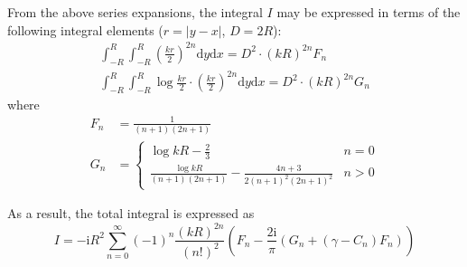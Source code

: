 \documentclass[a4paper,11pt]{article}
\newcommand{\td}{\mathrm{d}}
\newcommand{\ti}{\mathrm{i}}
\begin{document}
From the above series expansions, the integral $I$ may be expressed in terms of the following integral elements ($r=|y-x|$, $D = 2R$):
%
\begin{align}
\int_{-R}^{R} \int_{-R}^R  \left(\frac{kr}{2}\right)^{2n}  \td y \td x
= D^2 \cdot (kR)^{2n} F_n
\\
\int_{-R}^{R} \int_{-R}^R  \log \frac{kr}{2} \cdot \left(\frac{kr}{2}\right)^{2n}  \td y \td x
= D^2 \cdot (kR)^{2n} G_n
\end{align}
%
where
%
\begin{align}
F_n &= \frac{1}{(n+1)(2n+1)}
\\
G_n &= \begin{cases}
\log kR - \frac{2}{3} & n = 0 \\
\frac{\log kR}{(n+1)(2n+1)} - \frac{4n+3}{2(n+1)^2(2n+1)^2}& n > 0
\end{cases}
\end{align}

As a result, the total integral is expressed as
%
\begin{equation}
I = -\ti R^2
\sum_{n=0}^{\infty} (-1)^n \frac{(kR)^{2n}}{\left(n!\right)^2}
\left(
F_n
- \frac{2 \ti}{\pi}
\left(G_n + \left(\gamma - C_n \right) F_n \right)
\right)
\end{equation}
\end{document}
